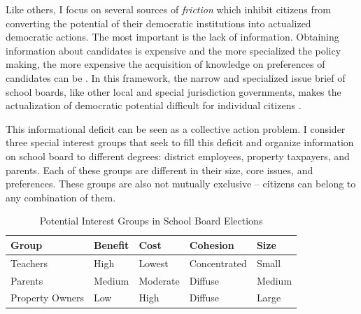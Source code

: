 Like others, I focus on several sources of \emph{friction} which inhibit 
citizens from converting the potential of their democratic institutions into 
actualized democratic actions. The most important is the lack of information. 
Obtaining information about candidates is expensive and the more specialized the 
policy making, the more expensive the acquisition of knowledge on preferences of 
candidates can be \citep{RefWorks:351}. In this framework, the narrow and 
specialized issue brief of school boards, like other local and special jurisdiction 
governments, makes the actualization of democratic potential difficult for 
individual citizens \citep{fosterK,burnsN}. 

This informational deficit can be seen as a collective action problem. I consider three special 
interest groups that seek to fill this deficit and organize information on school board to different 
degrees: district employees, property taxpayers, and parents. Each of these groups 
are different in their size, core issues, and preferences. These groups are also 
not mutually exclusive -- citizens can belong to any combination of them. 


\begin{table}[h!]
\begin{center}
\begin{small}
\caption{Potential Interest Groups in School Board Elections}
\label{tab:interests}
\begin{tabular}{| p{} | p{} | p{} | p{} | p{} |}
\hline
\textbf{Group}  & \textbf{Benefit} & \textbf{Cost} & \textbf{Cohesion}  & \textbf{Size} \\ \hline
Teachers  & High & Lowest & Concentrated & Small \\ \hline
Parents & Medium & Moderate & Diffuse & Medium \\ \hline
Property Owners & Low & High & Diffuse & Large \\ \hline
\end{tabular}
\end{small}
\end{center}
\end{table}

